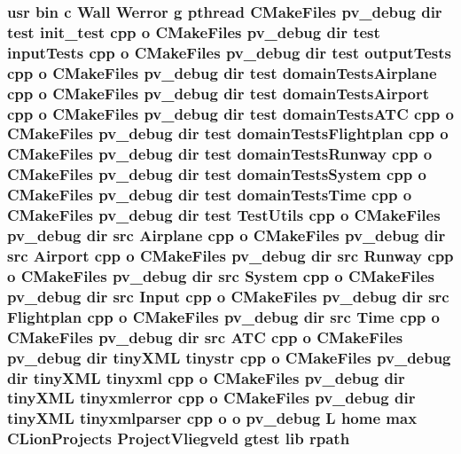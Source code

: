 \subsubsection[{\texorpdfstring{rpath}{rpath}}]{\setlength{\rightskip}{0pt plus 5cm}usr bin {\bf c} Wall Werror g pthread C\+Make\+Files pv\+\_\+debug dir test init\+\_\+test cpp o C\+Make\+Files pv\+\_\+debug dir test input\+Tests cpp o C\+Make\+Files pv\+\_\+debug dir test output\+Tests cpp o C\+Make\+Files pv\+\_\+debug dir test domain\+Tests\+Airplane cpp o C\+Make\+Files pv\+\_\+debug dir test domain\+Tests\+Airport cpp o C\+Make\+Files pv\+\_\+debug dir test domain\+Tests\+A\+TC cpp o C\+Make\+Files pv\+\_\+debug dir test domain\+Tests\+Flightplan cpp o C\+Make\+Files pv\+\_\+debug dir test domain\+Tests\+Runway cpp o C\+Make\+Files pv\+\_\+debug dir test domain\+Tests\+System cpp o C\+Make\+Files pv\+\_\+debug dir test domain\+Tests\+Time cpp o C\+Make\+Files pv\+\_\+debug dir test Test\+Utils cpp o C\+Make\+Files pv\+\_\+debug dir src {\bf Airplane} cpp o C\+Make\+Files pv\+\_\+debug dir src {\bf Airport} cpp o C\+Make\+Files pv\+\_\+debug dir src {\bf Runway} cpp o C\+Make\+Files pv\+\_\+debug dir src {\bf System} cpp o C\+Make\+Files pv\+\_\+debug dir src {\bf Input} cpp o C\+Make\+Files pv\+\_\+debug dir src {\bf Flightplan} cpp o C\+Make\+Files pv\+\_\+debug dir src {\bf Time} cpp o C\+Make\+Files pv\+\_\+debug dir src {\bf A\+TC} cpp o C\+Make\+Files pv\+\_\+debug dir tiny\+X\+ML tinystr cpp o C\+Make\+Files pv\+\_\+debug dir tiny\+X\+ML tinyxml cpp o C\+Make\+Files pv\+\_\+debug dir tiny\+X\+ML tinyxmlerror cpp o C\+Make\+Files pv\+\_\+debug dir tiny\+X\+ML tinyxmlparser cpp o o pv\+\_\+debug {\bf L} home max C\+Lion\+Projects Project\+Vliegveld gtest lib rpath}\hypertarget{pv__debug_8dir_2link_8txt_ae8b558f985c615973c12ba077fbbb061}{}\label{pv__debug_8dir_2link_8txt_ae8b558f985c615973c12ba077fbbb061}
